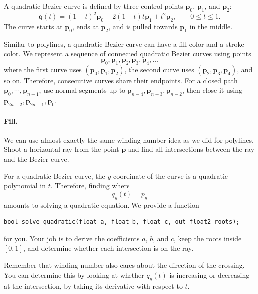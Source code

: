A quadratic Bezier curve is defined by three control points $\mathbf{p}_0$, $\mathbf{p}_1$, and $\mathbf{p}_2$:
\begin{equation}
    \mathbf{q}(t)
    =
    (1-t)^2 \mathbf{p}_0
    + 2(1-t)t \mathbf{p}_1
    + t^2 \mathbf{p}_2,
    \qquad 0 \le t \le 1.
\end{equation}
The curve starts at $\mathbf{p}_0$, ends at $\mathbf{p}_2$, and is pulled towards $\mathbf{p}_1$ in the middle.

Similar to polylines, a quadratic Bezier curve can have a fill color and a stroke color. 
We represent a sequence of connected quadratic Bezier curves using points
\begin{equation}
    \mathbf{p}_0, \mathbf{p}_1, \mathbf{p}_2,
    \mathbf{p}_3, \mathbf{p}_4, \ldots
\end{equation}
where the first curve uses $(\mathbf{p}_0,\mathbf{p}_1,\mathbf{p}_2)$, the second curve uses $(\mathbf{p}_2,\mathbf{p}_3,\mathbf{p}_4)$, and so on. Therefore, consecutive curves share their endpoints. For a closed path $\mathbf{p}_0,\cdots,\mathbf{p}_{n-1}$, use normal segments up to $\mathbf{p}_{n-4},\mathbf{p}_{n-3},\mathbf{p}_{n-2}$, then close it using $\mathbf{p}_{2n-2},\mathbf{p}_{2n-1},\mathbf{p}_0$.

\paragraph{Fill.}
We can use almost exactly the same winding-number idea as we did for polylines. Shoot a horizontal ray from the point $\mathbf{p}$ and find all intersections between the ray and the Bezier curve.

For a quadratic Bezier curve, the $y$ coordinate of the curve is a quadratic polynomial in $t$. Therefore, finding where
\begin{equation}
    q_y(t) = p_y
\end{equation}
amounts to solving a quadratic equation.
We provide a function
\begin{lstlisting}[language=Slang]
bool solve_quadratic(float a, float b, float c, out float2 roots);
\end{lstlisting}
for you. Your job is to derive the coefficients $a$, $b$, and $c$, keep the roots inside $[0,1]$, and determine whether each intersection is on the ray. 

Remember that winding number also cares about the direction of the crossing. You can determine this by looking at whether $q_y(t)$ is increasing or decreasing at the intersection, by taking its derivative with respect to $t$.

